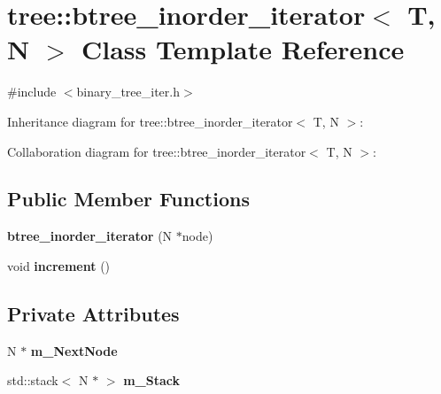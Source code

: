 \hypertarget{classtree_1_1btree__inorder__iterator}{\section{tree\-:\-:btree\-\_\-inorder\-\_\-iterator$<$ T, N $>$ Class Template Reference}
\label{classtree_1_1btree__inorder__iterator}
}


{\ttfamily \#include $<$binary\-\_\-tree\-\_\-iter.\-h$>$}



Inheritance diagram for tree\-:\-:btree\-\_\-inorder\-\_\-iterator$<$ T, N $>$\-:


Collaboration diagram for tree\-:\-:btree\-\_\-inorder\-\_\-iterator$<$ T, N $>$\-:
\subsection*{Public Member Functions}
\begin{DoxyCompactItemize}
\item 
\hypertarget{classtree_1_1btree__inorder__iterator_abb3121aadd921041e0af5a28d527eaf2}{{\bfseries btree\-\_\-inorder\-\_\-iterator} (N $\ast$node)}\label{classtree_1_1btree__inorder__iterator_abb3121aadd921041e0af5a28d527eaf2}

\item 
\hypertarget{classtree_1_1btree__inorder__iterator_ae42f42822641ec3d55e2e570f9e0d897}{void {\bfseries increment} ()}\label{classtree_1_1btree__inorder__iterator_ae42f42822641ec3d55e2e570f9e0d897}

\end{DoxyCompactItemize}
\subsection*{Private Attributes}
\begin{DoxyCompactItemize}
\item 
\hypertarget{classtree_1_1btree__inorder__iterator_aa2586ca852a9b462b0774af427a7a10f}{N $\ast$ {\bfseries m\-\_\-\-Next\-Node}}\label{classtree_1_1btree__inorder__iterator_aa2586ca852a9b462b0774af427a7a10f}

\item 
\hypertarget{classtree_1_1btree__inorder__iterator_a35c2412b7ad6f89a8ca7eeb2eef3f413}{std\-::stack$<$ N $\ast$ $>$ {\bfseries m\-\_\-\-Stack}}\label{classtree_1_1btree__inorder__iterator_a35c2412b7ad6f89a8ca7eeb2eef3f413}

\end{DoxyCompactItemize}
